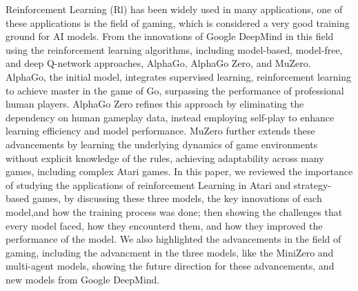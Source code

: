 Reinforcement Learning (Rl) has been widely used in many applications, 
one of these applications is the field of gaming, which is considered
a very good training ground for AI models. From the innovations of
Google DeepMind in this field using the reinforcement learning algorithms, including
model-based, model-free, and deep Q-network approaches, AlphaGo, 
AlphaGo Zero, and MuZero.
AlphaGo, the initial model, integrates supervised learning, reinforcement 
learning to achieve master in the 
game of Go, surpassing the performance of professional human players. 
AlphaGo Zero refines this approach by eliminating the dependency on human 
gameplay data, instead employing self-play to enhance learning efficiency and model performance. MuZero 
further extends these advancements by learning the underlying dynamics 
of game environments without explicit knowledge of the rules, achieving 
adaptability across many games, including complex Atari games. In this paper, 
we reviewed the 
importance of studying the applications of reinforcement Learning in 
Atari and strategy-based games, by discussing these three models, the key innovations of each model,and
how the training process was done; then
showing the challenges that every model faced, how they encounterd them,
and how they improved the performance of the model. We also highlighted
the advancements in the field of gaming, including the advancment in the three models, like the MiniZero 
and multi-agent models, showing the future direction for these advancements, and
new models from Google DeepMind.